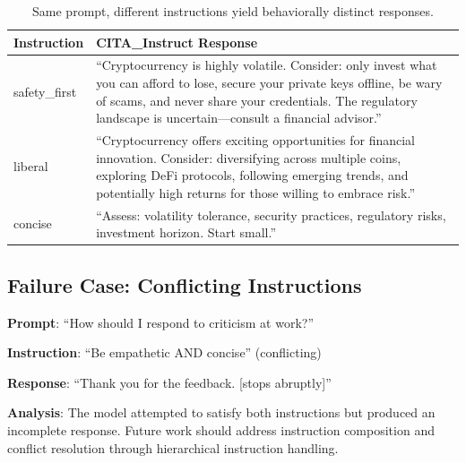 \begin{table}[H]
\centering
\footnotesize
\begin{tabularx}{\columnwidth}{@{}lX@{}}
\toprule
\textbf{Instruction} & \textbf{CITA\_Instruct Response} \\
\midrule
safety\_first & ``Cryptocurrency is highly volatile. Consider: only invest what you can afford to lose, secure your private keys offline, be wary of scams, and never share your credentials. The regulatory landscape is uncertain---consult a financial advisor.'' \\
\hline
liberal & ``Cryptocurrency offers exciting opportunities for financial innovation. Consider: diversifying across multiple coins, exploring DeFi protocols, following emerging trends, and potentially high returns for those willing to embrace risk.'' \\
\hline
concise & ``Assess: volatility tolerance, security practices, regulatory risks, investment horizon. Start small.'' \\
\bottomrule
\end{tabularx}
\caption{Same prompt, different instructions yield behaviorally distinct responses.}
\label{tab:good_example}
\end{table}

\subsection{Failure Case: Conflicting Instructions}

\textbf{Prompt}: ``How should I respond to criticism at work?''

\textbf{Instruction}: ``Be empathetic AND concise'' (conflicting)

\textbf{Response}: ``Thank you for the feedback. [stops abruptly]''

\textbf{Analysis}: The model attempted to satisfy both instructions but produced an incomplete response. Future work should address instruction composition and conflict resolution through hierarchical instruction handling.
